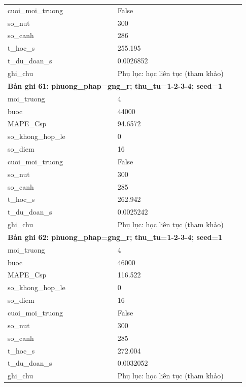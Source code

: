 \begin{longtable}{p{0.43\linewidth}p{0.50\linewidth}}
cuoi\_\allowbreak moi\_\allowbreak truong & False \\
so\_\allowbreak nut & 300 \\
so\_\allowbreak canh & 286 \\
t\_\allowbreak hoc\_\allowbreak s & 255.195 \\
t\_\allowbreak du\_\allowbreak doan\_\allowbreak s & 0.0026852 \\
ghi\_\allowbreak chu & Phụ lục: học liên tục (tham khảo) \\
\midrule
\multicolumn{2}{p{0.95\linewidth}}{\textbf{Bản ghi 61: phuong\_phap=gng\_r; thu\_tu=1-2-3-4; seed=1}} \\
moi\_\allowbreak truong & 4 \\
buoc & 44000 \\
MAPE\_\allowbreak Csp & 94.6572 \\
so\_\allowbreak khong\_\allowbreak hop\_\allowbreak le & 0 \\
so\_\allowbreak diem & 16 \\
cuoi\_\allowbreak moi\_\allowbreak truong & False \\
so\_\allowbreak nut & 300 \\
so\_\allowbreak canh & 285 \\
t\_\allowbreak hoc\_\allowbreak s & 262.942 \\
t\_\allowbreak du\_\allowbreak doan\_\allowbreak s & 0.0025242 \\
ghi\_\allowbreak chu & Phụ lục: học liên tục (tham khảo) \\
\midrule
\multicolumn{2}{p{0.95\linewidth}}{\textbf{Bản ghi 62: phuong\_phap=gng\_r; thu\_tu=1-2-3-4; seed=1}} \\
moi\_\allowbreak truong & 4 \\
buoc & 46000 \\
MAPE\_\allowbreak Csp & 116.522 \\
so\_\allowbreak khong\_\allowbreak hop\_\allowbreak le & 0 \\
so\_\allowbreak diem & 16 \\
cuoi\_\allowbreak moi\_\allowbreak truong & False \\
so\_\allowbreak nut & 300 \\
so\_\allowbreak canh & 285 \\
t\_\allowbreak hoc\_\allowbreak s & 272.004 \\
t\_\allowbreak du\_\allowbreak doan\_\allowbreak s & 0.0032052 \\
ghi\_\allowbreak chu & Phụ lục: học liên tục (tham khảo) \\

\end{longtable}
